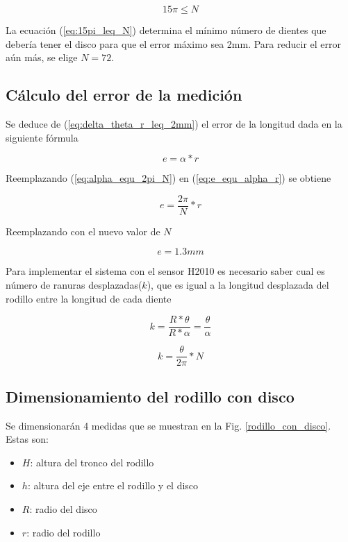 \documentclass[main_conf.tex]{subfiles}
\begin{document}
\begin{equation}
\label{eq:15pi_leq_N}
15\pi \leq N
\end{equation}

La ecuación (\ref{eq:15pi_leq_N}) determina el mínimo número de
dientes que debería tener el disco para que el error máximo sea
2mm. Para reducir el error aún más, se elige $N=72$.

\subsection{Cálculo del error de la medición}

Se deduce de (\ref{eq:delta_theta_r_leq_2mm}) el error de la
longitud dada en la siguiente fórmula

\begin{equation}
\label{eq:e_equ_alpha_r}
e = \alpha * r
\end{equation}

Reemplazando (\ref{eq:alpha_equ_2pi_N}) en (\ref{eq:e_equ_alpha_r}) se
obtiene

\begin{equation}
e = \frac{2\pi}{N} * r
\end{equation}

Reemplazando con el nuevo valor de $N$

\begin{equation}
e = 1.3mm
\end{equation}

Para implementar el sistema con el sensor H2010 es necesario saber
cual es número de ranuras desplazadas($k$), que es igual a
la longitud desplazada del rodillo entre la longitud de cada diente

\begin{equation}
k = \frac{R * \theta}{R * \alpha}
  = \frac{\theta}{\alpha}
\end{equation}

\begin{equation}
k = \frac{\theta}{2\pi}*N
\end{equation}

\subsection{Dimensionamiento del rodillo con disco}
Se dimensionarán 4 medidas que se muestran en la Fig.
\ref{rodillo_con_disco}. Estas son:

\begin{itemize}
\item $H$: altura del tronco del rodillo
\item $h$: altura del eje entre el rodillo y el disco
\item $R$: radio del disco
\item $r$: radio del rodillo
\end{itemize}
\end{document}

